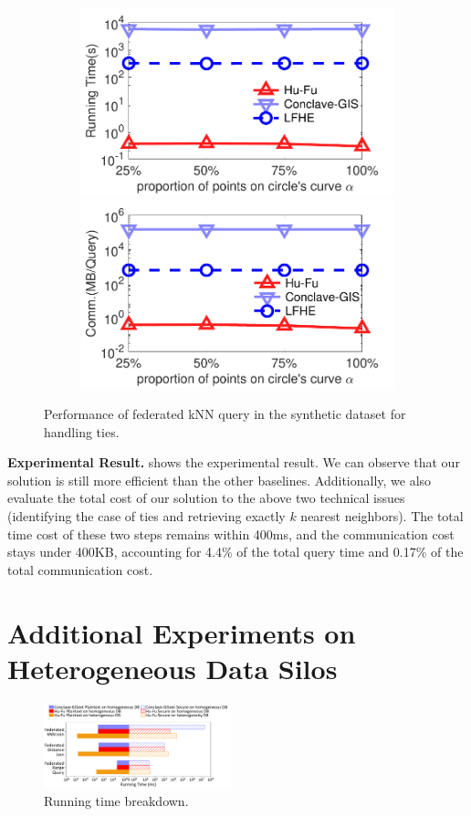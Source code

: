 \begin{figure}[t]
    \centering
    \begin{subfigure}{0.48\textwidth}
        \centering
        \includegraphics[width=0.48\linewidth]{apdx/random_knn_corner_time.pdf}
        \includegraphics[width=0.48\linewidth]{apdx/random_knn_corner_comm.pdf}
    \end{subfigure}
    \caption{Performance of  federated kNN query in the synthetic dataset for handling ties.}
    \label{fig:random-knn-corner}
\end{figure}

\textbf{Experimental Result.}
 shows the experimental result. 
We can observe that our solution \sysname is still more efficient than the other baselines.
Additionally, we also evaluate the total cost of our solution to the above two technical issues (\ie identifying the case of ties and retrieving exactly $k$ nearest neighbors).
The total time cost of these two steps remains within 400ms, and the communication cost stays under 400KB, accounting for 4.4\% of the total query time and 0.17\% of the total communication cost.

\section{Additional Experiments on Heterogeneous Data Silos}\label{app:exp-2}

\begin{figure}[t]
    \centering
    \includegraphics[width=0.48\textwidth]{apdx/database_compare_range.pdf}
    \caption{Running time breakdown.}
    \label{fig:database-cmp-range}
\end{figure}

